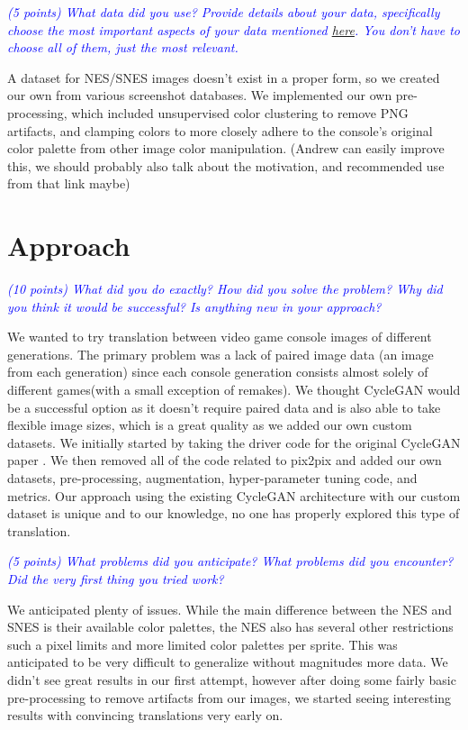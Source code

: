 \documentclass[10pt,twocolumn,letterpaper]{article}
\begin{document}
\textit{\textcolor{blue}{(5 points) What data did you use? Provide details about your data, specifically choose the most important aspects of your data mentioned \href{https://arxiv.org/abs/1803.09010}{here}. You don’t have to choose all of them, just the most relevant.}}

A dataset for NES/SNES images doesn't exist in a proper form, so we created our own from various screenshot databases. We implemented our own pre-processing, which included unsupervised color clustering to remove PNG artifacts, and clamping colors to more closely adhere to the console's original color palette from other image color manipulation. (Andrew can easily improve this, we should probably also talk about the motivation, and recommended use from that link maybe)

\section{Approach}

\textit{\textcolor{blue}{(10 points) What did you do exactly? How did you solve the problem? Why did you think it would be successful? Is anything new in your approach?}}

We wanted to try translation between video game console images of different generations. The primary problem was a lack of paired image data (an image from each generation) since each console generation consists almost solely of different games(with a small exception of remakes). We thought CycleGAN would be a successful option as it doesn't require paired data and is also able to take flexible image sizes, which is a great quality as we added our own custom datasets. We initially started by taking the driver code for the original CycleGAN paper \cite{CycleGAN}. We then removed all of the code related to pix2pix and added our own datasets, pre-processing, augmentation, hyper-parameter tuning code, and metrics. Our approach using the existing CycleGAN architecture with our custom dataset is unique and to our knowledge, no one has properly explored this type of translation.

\textit{\textcolor{blue}{(5 points) What problems did you anticipate? What problems did you encounter? Did the very first thing you tried work?}}

We anticipated plenty of issues. While the main difference between the NES and SNES is their available color palettes, the NES also has several other restrictions such a pixel limits and more limited color palettes per sprite. This was anticipated to be very difficult to generalize without magnitudes more data. We didn't see great results in our first attempt, however after doing some fairly basic pre-processing to remove artifacts from our images, we started seeing interesting results with convincing translations very early on.
\end{document}

